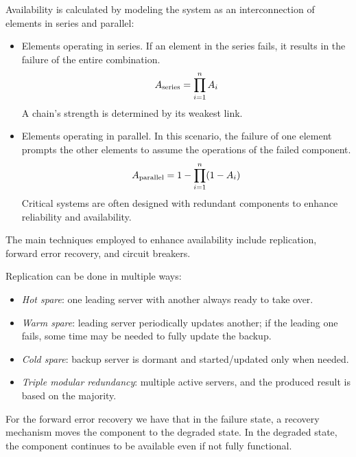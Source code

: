 Availability is calculated by modeling the system as an interconnection of elements in series and parallel:
\begin{itemize}
    \item Elements operating in series. 
        If an element in the series fails, it results in the failure of the entire combination.
        \[A_{\textnormal{series}}=\prod_{i=1}^n A_i\]
        A chain's strength is determined by its weakest link.
    \item Elements operating in parallel. 
        In this scenario, the failure of one element prompts the other elements to assume the operations of the failed component.
        \[A_{\textnormal{parallel}}=1-\prod_{i=1}^n (1-A_i)\]
        Critical systems are often designed with redundant components to enhance reliability and availability.
\end{itemize}

The main techniques employed to enhance availability include replication, forward error recovery, and circuit breakers.

Replication can be done in multiple ways: 
\begin{itemize}
    \item \textit{Hot spare}: one leading server with another always ready to take over.
    \item \textit{Warm spare}: leading server periodically updates another; if the leading one fails, some time may be needed to fully update the backup.
    \item \textit{Cold spare}: backup server is dormant and started/updated only when needed.
    \item \textit{Triple modular redundancy}: multiple active servers, and the produced result is based on the majority.
\end{itemize}

For the forward error recovery we have that in the failure state, a recovery mechanism moves the component to the degraded state.
In the degraded state, the component continues to be available even if not fully functional.